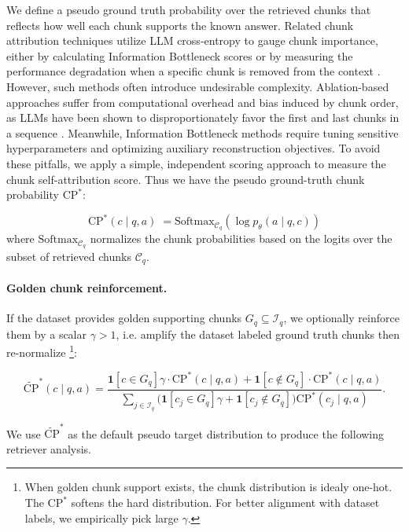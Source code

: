 \documentclass{article}
\theoremstyle{plain}
\theoremstyle{definition}
\theoremstyle{remark}
\begin{document}
We define a pseudo ground truth probability over the retrieved chunks that reflects how well each chunk supports the known answer. Related chunk attribution techniques utilize LLM cross-entropy to gauge chunk importance, either by calculating Information Bottleneck scores \cite{zhu2024information} or by measuring the performance degradation when a specific chunk is removed from the context \cite{deng2025influence}. However, such methods often introduce undesirable complexity. Ablation-based approaches suffer from computational overhead and bias induced by chunk order, as LLMs have been shown to disproportionately favor the first and last chunks in a sequence \cite{liu2024pointwise}. Meanwhile, Information Bottleneck methods require tuning sensitive hyperparameters and optimizing auxiliary reconstruction objectives. To avoid these pitfalls, we apply a simple, independent scoring approach to measure the chunk self-attribution score. Thus we have the pseudo ground-truth chunk probability $\mathrm{CP}^\ast$:

\begin{equation}
\label{eq:CPast}
\mathrm{CP}^\ast(c\mid q,a)\;=\mathrm{Softmax}_{\mathcal{C}_q}(\log p_\theta(a\mid q,c))
\end{equation}
where $\mathrm{Softmax}_{\mathcal{C}_q}$ normalizes the chunk probabilities based on the logits over the subset of retrieved chunks $\mathcal{C}_q$.

\paragraph{Golden chunk reinforcement.}
If the dataset provides golden supporting chunks $G_q\subseteq \mathcal{I}_q$, we optionally reinforce them by a scalar $\gamma>1$, i.e. amplify the dataset labeled ground truth chunks then re-normalize
\footnote{When golden chunk support exists, the chunk distribution is idealy one-hot. The $\mathrm{CP}^\ast$ softens the hard distribution. For better alignment with dataset labels, we empirically pick large $\gamma$.}:
\begin{tiny}
\begin{equation}
\label{eq:CPasttilde}
\widetilde{\mathrm{CP}}^\ast(c\mid q,a)=
\frac{\mathbf{1}[c\in G_q]\gamma\cdot \mathrm{CP}^\ast(c\mid q,a)
+\mathbf{1}[c\notin G_q]\cdot \mathrm{CP}^\ast(c\mid q,a)}
{\sum_{j\in\mathcal{I}_q}\big(\mathbf{1}[c_j\in G_q]\gamma+\mathbf{1}[c_j\notin G_q]\big)\mathrm{CP}^\ast(c_j\mid q,a)}.
\end{equation}
\end{tiny}
We use $\widetilde{\mathrm{CP}}^\ast$ as the default pseudo target distribution to produce the following retriever analysis.
\end{document}
